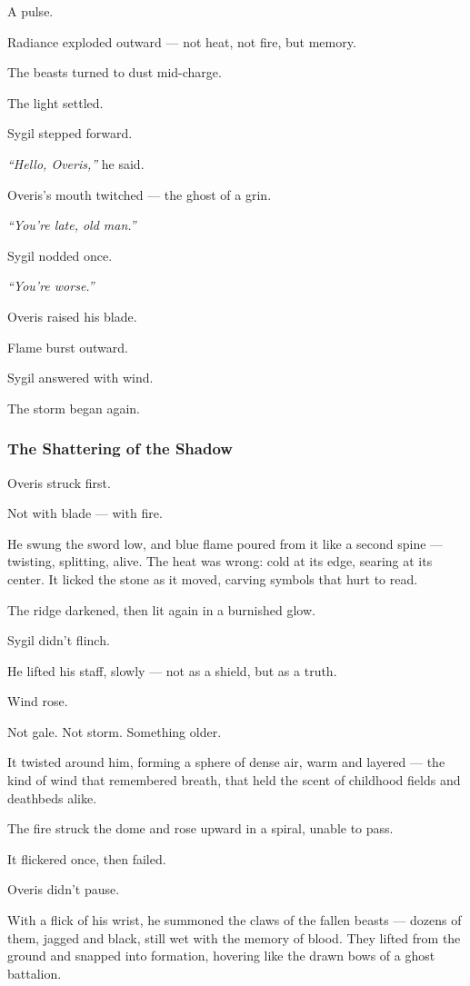\documentclass[12pt]{article}
\begin{document}
A pulse.

Radiance exploded outward — not heat, not fire, but memory.

The beasts turned to dust mid-charge.

The light settled.

Sygil stepped forward.

\textit{“Hello, Overis,”} he said.

Overis’s mouth twitched — the ghost of a grin.

\textit{“You’re late, old man.”}

Sygil nodded once.

\textit{“You’re worse.”}

Overis raised his blade.

Flame burst outward.

Sygil answered with wind.

The storm began again.

\dotfill

\subsubsection*{The Shattering of the Shadow}

Overis struck first.

Not with blade — with fire.

He swung the sword low, and blue flame poured from it like a second spine — twisting, splitting, alive. The heat was wrong: cold at its edge, searing at its center. It licked the stone as it moved, carving symbols that hurt to read.

The ridge darkened, then lit again in a burnished glow.

Sygil didn’t flinch.

He lifted his staff, slowly — not as a shield, but as a truth.

Wind rose.

Not gale. Not storm. Something older.

It twisted around him, forming a sphere of dense air, warm and layered — the kind of wind that remembered breath, that held the scent of childhood fields and deathbeds alike.

The fire struck the dome and rose upward in a spiral, unable to pass.

It flickered once, then failed.

\bigskip

Overis didn’t pause.

With a flick of his wrist, he summoned the claws of the fallen beasts — dozens of them, jagged and black, still wet with the memory of blood. They lifted from the ground and snapped into formation, hovering like the drawn bows of a ghost battalion.
\end{document}
